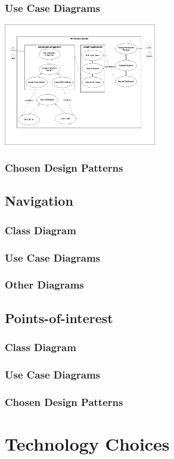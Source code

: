 \documentclass{article}
\begin{document}
        \subsubsection{Use Case Diagrams}
    			\includegraphics[width=0.5\textwidth]{NotificationUseCases}	
        \subsubsection{Chosen Design Patterns}
    \subsection{Navigation}
        \subsubsection{Class Diagram}
        \subsubsection{Use Case Diagrams}
        \subsubsection{Other Diagrams}
    \subsection{Points-of-interest}
        \subsubsection{Class Diagram}
        \subsubsection{Use Case Diagrams}
        \subsubsection{Chosen Design Patterns}
\section{Technology Choices}

\end{document}
